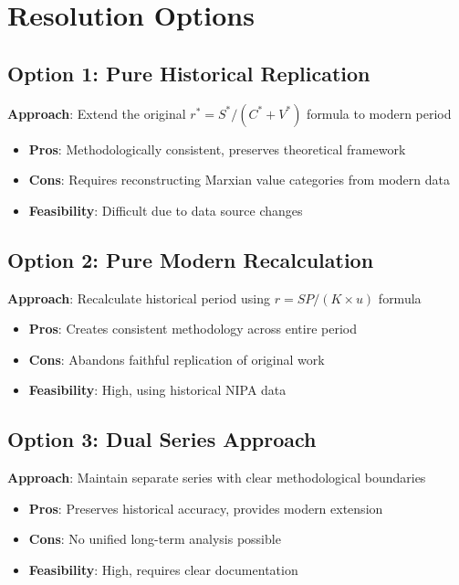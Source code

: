 \documentclass[12pt]{article}
\begin{document}
\section{Resolution Options}

\subsection{Option 1: Pure Historical Replication}

\textbf{Approach}: Extend the original $r^* = S^*/(C^* + V^*)$ formula to modern period
\begin{itemize}
    \item \textbf{Pros}: Methodologically consistent, preserves theoretical framework
    \item \textbf{Cons}: Requires reconstructing Marxian value categories from modern data
    \item \textbf{Feasibility}: Difficult due to data source changes
\end{itemize}

\subsection{Option 2: Pure Modern Recalculation}

\textbf{Approach}: Recalculate historical period using $r = SP/(K \times u)$ formula
\begin{itemize}
    \item \textbf{Pros}: Creates consistent methodology across entire period
    \item \textbf{Cons}: Abandons faithful replication of original work
    \item \textbf{Feasibility}: High, using historical NIPA data
\end{itemize}

\subsection{Option 3: Dual Series Approach}

\textbf{Approach}: Maintain separate series with clear methodological boundaries
\begin{itemize}
    \item \textbf{Pros}: Preserves historical accuracy, provides modern extension
    \item \textbf{Cons}: No unified long-term analysis possible
    \item \textbf{Feasibility}: High, requires clear documentation
\end{itemize}
\end{document}
